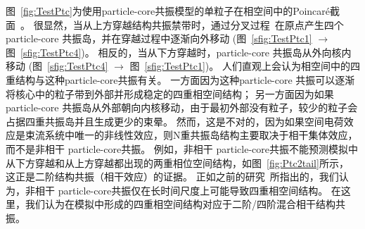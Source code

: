 图~\ref{fig:TestPtc}为使用particle-core共振模型的单粒子在相空间中的Poincar\'{e}截面~\cite{27,28}。
很显然，当从上方穿越结构共振禁带时，通过分叉过程~\cite{29,30}在原点产生四个particle-core 共振岛，并在穿越过程中逐渐向外移动
(图~\ref{sfig:TestPtc1} $\rightarrow$ 图~\ref{sfig:TestPtc4})。
相反的，当从下方穿越时，particle-core 共振岛从外向核内移动
(图~\ref{sfig:TestPtc4} $\rightarrow$ 图~\ref{sfig:TestPtc1})。
人们直观上会认为相空间中的四重结构与这种particle-core共振有关。
一方面因为这种particle-core 共振可以逐渐将核心中的粒子带到外部并形成稳定的四重相空间结构；
另一方面因为如果particle-core 共振岛从外部朝向内核移动，由于最初外部没有粒子，较少的粒子会占据四重共振岛并且生成更少的束晕。
然而，这是不对的，因为如果空间电荷效应是束流系统中唯一的非线性效应，则N重共振岛结构主要取决于相干集体效应，而不是非相干 particle-core共振。
例如，非相干 particle-core共振不能预测模拟中从下方穿越和从上方穿越都出现的两重相位空间结构，如图~\ref{fig:Ptc2tail}所示，
这正是二阶结构共振（相干效应）的证据。
正如之前的研究~\cite{17}所指出的，我们认为，非相干 particle-core共振仅在长时间尺度上可能导致四重相空间结构。
在这里，我们认为在模拟中形成的四重相空间结构对应于二阶/四阶混合相干结构共振。


